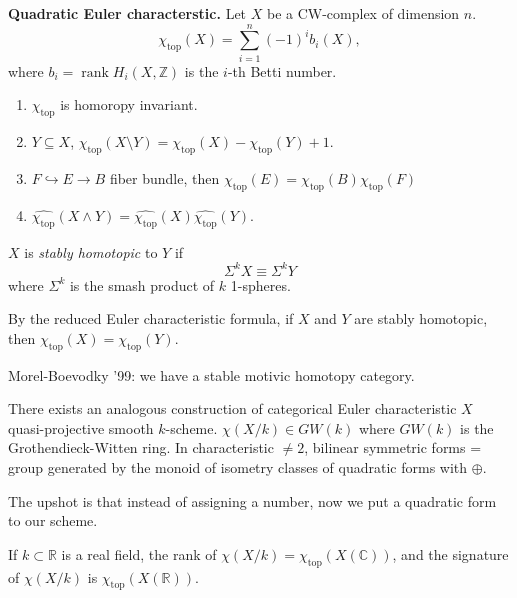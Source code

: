 \medskip\noindent
{\bf Quadratic Euler characterstic.} 
Let $X$ be a CW-complex of dimension $n$.
$$
\chi_{\operatorname{top}}(X)
=\sum_{i=1}^n(-1)^i b_i(X),
$$
where
$b_i=\operatorname{rank}H_i(X,\mathbb{Z})$
is the $i$-th Betti number.

\begin{proposition}
\label{proposition-properties-of-euler}
\begin{enumerate}
\item $\chi_{\operatorname{top}}$
is homoropy invariant.
\item $Y \subseteq X$,
$\chi_{\operatorname{top}}(X\setminus Y)
=\chi_{\operatorname{top}}(X)
-\chi_{\operatorname{top}}(Y)+1$.
\item $F \hookrightarrow E \to B$ fiber
bundle, then $\chi_{\operatorname{top}}(E) =
\chi_{\operatorname{top}}(B)
\chi_{\operatorname{top}}(F)$

\item $\hat{\chi_{\operatorname{top}}}(X
\wedge Y) =
\hat{\chi_{\operatorname{top}}}(X)
\hat{\chi_{\operatorname{top}}}(Y)$.
\end{enumerate}
\end{proposition}

\begin{definition}
\label{definition-stably-homotopic}
$X$ is {\it stably homotopic} to $Y$
if
$$
\Sigma^kX \equiv \Sigma^kY
$$
where $\Sigma^k$ is the smash product
of $k$ 1-spheres.
\end{definition}

\noindent
By the reduced Euler characteristic formula,
if $X$ and $Y$ are stably homotopic,
then $\chi_{\operatorname{top}}(X)
=\chi_{\operatorname{top}}(Y)$.

\medskip\noindent
Morel-Boevodky '99: we have
a stable motivic homotopy category.

There exists an analogous construction
of categorical Euler characteristic
$X$ quasi-projective smooth $k$-scheme.
$\chi(X/k) \in GW(k)$
where $GW(k)$ is the Grothendieck-Witten
ring. In characteristic $\neq 2$, 
bilinear symmetric forms = group
generated by the monoid of isometry
classes of quadratic forms with $\oplus$.

The upshot is that instead
of assigning a number, now we put
a quadratic form to our scheme.

\begin{remark}
\label{remark-real-field-euler}
If $k \subset \mathbb{R}$ is a real field,
the rank of $\chi(X/k) =
\chi_{\operatorname{top}}(X(\mathbb{C}))$,
and the signature of $\chi(X/k)$
is
$\chi_{\operatorname{top}}(X(\mathbb{R}))$.
\end{remark}

